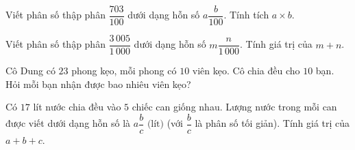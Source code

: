 \begin{ex} %
Viết phân số thập phân $\dfrac{703}{100}$ dưới dạng hỗn số $a\dfrac{b}{100}$. Tính tích $a \times b$.
\end{ex}

\begin{ex} %
Viết phân số thập phân $\dfrac{3\,005}{1\,000}$ dưới dạng hỗn số $m\dfrac{n}{1\,000}$. Tính giá trị của $m + n$.
\end{ex}

\begin{ex} %
Cô Dung có $23$ phong kẹo, mỗi phong có $10$ viên kẹo. Cô chia đều cho $10$ bạn. Hỏi mỗi bạn nhận được bao nhiêu viên kẹo?
\end{ex}

\begin{ex} %
Có $17$ lít nước chia đều vào $5$ chiếc can giống nhau. Lượng nước trong mỗi can được viết dưới dạng hỗn số là $a\dfrac{b}{c}\text{ (lít)}$ (với $\dfrac{b}{c}$ là phân số tối giản). Tính giá trị của $a + b + c$.
\end{ex}
